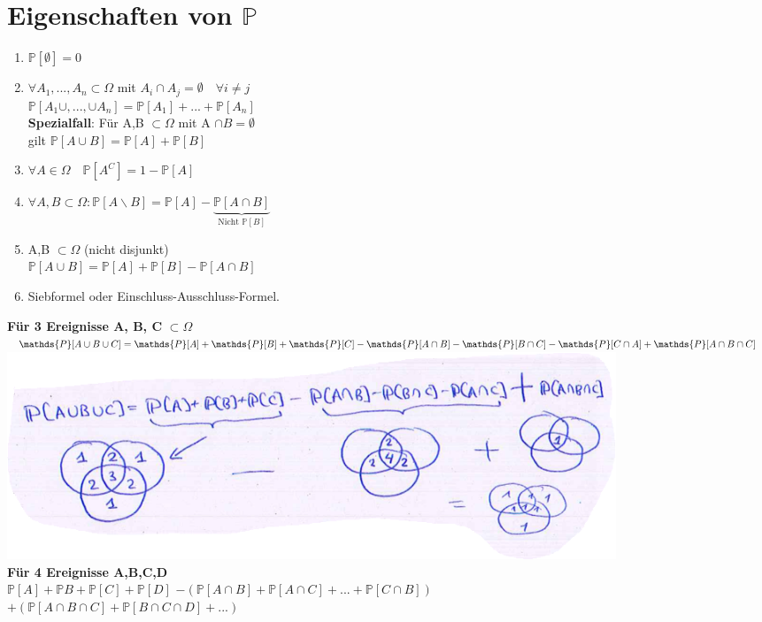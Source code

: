 \section{Eigenschaften von $\mathds{P}$}
\begin{enumerate}
	\item $\mathds{P}[\emptyset]=0$
	\item $\forall A_1,...,A_n \subset \Omega $ mit $A_i \cap A_j = \emptyset \quad \forall i \neq j$\\
	$\mathds{P}[A_1\cup,...,\cup A_n] = \mathds{P}[A_1]+...+\mathds{P}[A_n]$\medskip\\
	\textbf{Spezialfall}: Für A,B $\subset \Omega$ mit A $\cap B = \emptyset$\\gilt 
	$\mathds{P}[A\cup B] = \mathds{P}[A] + \mathds{P}[B]$
	\item $\forall A \in \Omega \quad \mathds{P}[A^C]=1-\mathds{P}[A]$
	\item $\forall A, B \subset \Omega : \mathds{P}[A\backslash B] =\mathds{P}[A]-\underbrace{\mathds{P}[A\cap B]}_{\text{Nicht }\mathds{P}[B]}$
	\item A,B $\subset \Omega$ (nicht disjunkt)\\
	$\mathds{P}[A\cup B] = \mathds{P}[A] + \mathds{P}[B] - \mathds{P}[A\cap B]$
	\item Siebformel oder Einschluss-Ausschluss-Formel.\\
	\end{enumerate}
\newpage
	\textbf{Für 3 Ereignisse A, B, C} $\subset \Omega$\\ $\mathds{P}[A\cup B \cup C]=
	\\\mathds{P}[A]+\mathds{P}[B]+\mathds{P}[C]-\mathds{P}[A\cap B] - \mathds{P}[B \cap C]-\mathds{P}[C\cap A] + \mathds{P}[A\cap B \cap C]$\medskip\\
	\includegraphics[width=0.8\textwidth]{img/sieb.PNG}\medskip\\
	\textbf{Für 4 Ereignisse A,B,C,D}\\
	$\mathds{P}[A]+\mathds{P}B+\mathds{P}[C]+\mathds{P}[D]$
	$-(\mathds{P}[A\cap B]+\mathds{P}[A\cap C ]+...+\mathds{P}[C\cap B]) $\smallskip
\\	$+ (\mathds{P}[A \cap B \cap C ] + \mathds{P}[B \cap C \cap D]+...)$
